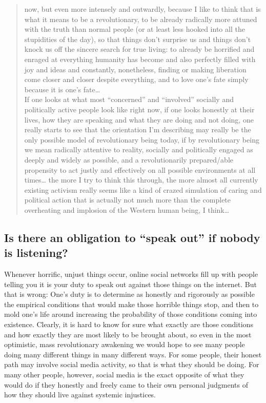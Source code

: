 \documentclass[a4paper,12pt,margin=.5in]{article}
\begin{document}
\begin{quote}
now, but even more intensely and outwardly, because I like to think that
is what it means to be a revolutionary, to be already radically more
attuned with the truth than normal people (or at least less hooked into
all the stupidities of the day), so that things don't surprise us and
things don't knock us off the sincere search for true living: to already
be horrified and enraged at everything humanity has become and also
perfectly filled with joy and ideas and constantly, nonetheless, finding
or making liberation come closer and closer despite everything, and to
love one's fate simply because it is one's fate\ldots{}\\
\hspace*{0.333em} If one looks at what most ``concerned'' and
``involved'' socially and politically active people look like right now,
if one looks honestly at their lives, how they are speaking and what
they are doing and not doing, one really starts to see that the
orientation I'm describing may really be the only possible model of
revolutionary being today, if by revolutionary being we mean radically
attentive to reality, socially and politically engaged as deeply and
widely as possible, and a revolutionarily prepared/able propensity to
act justly and effectively on all possible environments at all
times\ldots{} the more I try to think this through, the more almost all
currently existing activism really seems like a kind of crazed
simulation of caring and political action that is actually not much more
than the complete overheating and implosion of the Western human being,
I think\ldots{}
\end{quote}

\subsection{\texorpdfstring{Is there an obligation to ``speak out'' if
nobody is
listening?}{Is there an obligation to speak out if nobody is listening?}}\label{is-there-an-obligation-to-speak-out-if-nobody-is-listening}

Whenever horrific, unjust things occur, online social networks fill up
with people telling you it is your duty to speak out against those
things on the internet. But that is wrong: One's duty is to determine as
honestly and rigorously as possible the empirical conditions that would
make those horrible things stop, and then to mold one's life around
increasing the probability of those conditions coming into existence.
Clearly, it is hard to know for sure what exactly are those conditions
and how exactly they are most likely to be brought about, so even in the
most optimistic, mass revolutionary awakening we would hope to see many
people doing many different things in many different ways. For some
people, their honest path may involve social media activity, so that is
what they should be doing. For many other people, however, social media
is the exact opposite of what they would do if they honestly and freely
came to their own personal judgments of how they should live against
systemic injustices.
\end{document}
